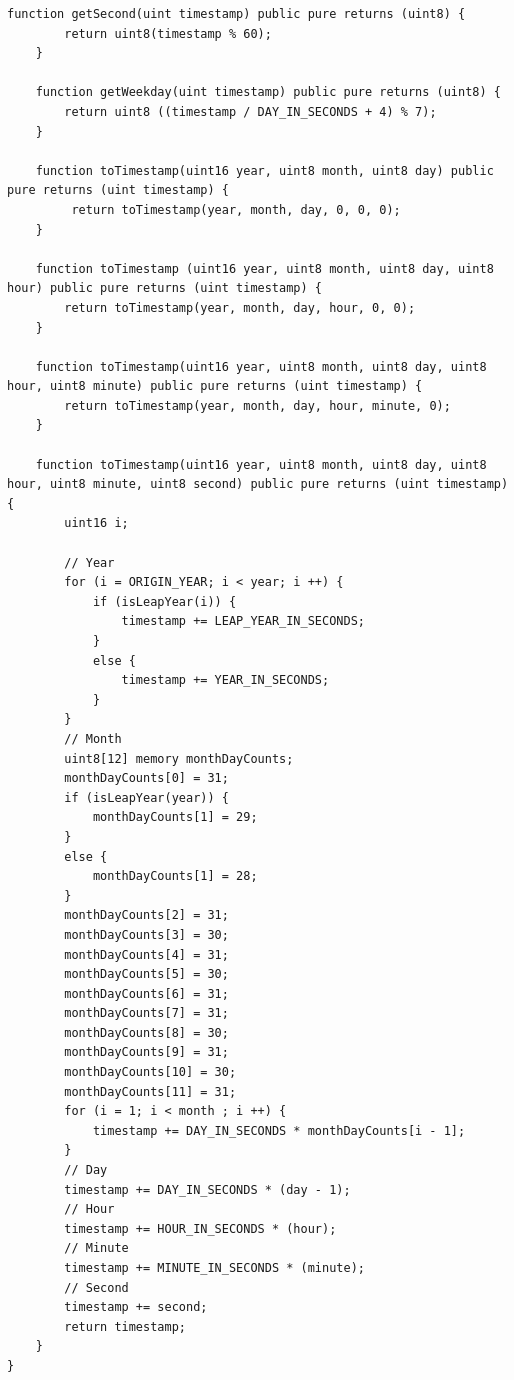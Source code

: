 \documentclass[a4paper]{article}
\begin{document}
\begin{frame}
\begin{lstlisting}[basicstyle=\small]
    function getSecond(uint timestamp) public pure returns (uint8) {
        return uint8(timestamp % 60);
    }
    
    function getWeekday(uint timestamp) public pure returns (uint8) {
        return uint8 ((timestamp / DAY_IN_SECONDS + 4) % 7);
    }
    
    function toTimestamp(uint16 year, uint8 month, uint8 day) public pure returns (uint timestamp) {
         return toTimestamp(year, month, day, 0, 0, 0);
    }
    
    function toTimestamp (uint16 year, uint8 month, uint8 day, uint8 hour) public pure returns (uint timestamp) {
        return toTimestamp(year, month, day, hour, 0, 0);
    }
    
    function toTimestamp(uint16 year, uint8 month, uint8 day, uint8 hour, uint8 minute) public pure returns (uint timestamp) {
        return toTimestamp(year, month, day, hour, minute, 0);
    }
    
    function toTimestamp(uint16 year, uint8 month, uint8 day, uint8 hour, uint8 minute, uint8 second) public pure returns (uint timestamp) {
        uint16 i;

        // Year
        for (i = ORIGIN_YEAR; i < year; i ++) {
            if (isLeapYear(i)) {
                timestamp += LEAP_YEAR_IN_SECONDS;
            }
            else {
                timestamp += YEAR_IN_SECONDS;
            }
        }
        // Month
        uint8[12] memory monthDayCounts;
        monthDayCounts[0] = 31;
        if (isLeapYear(year)) {
            monthDayCounts[1] = 29;
        }
        else {
            monthDayCounts[1] = 28;
        }
        monthDayCounts[2] = 31;
        monthDayCounts[3] = 30;
        monthDayCounts[4] = 31;
        monthDayCounts[5] = 30;
        monthDayCounts[6] = 31;
        monthDayCounts[7] = 31;
        monthDayCounts[8] = 30;
        monthDayCounts[9] = 31;
        monthDayCounts[10] = 30;
        monthDayCounts[11] = 31;
        for (i = 1; i < month ; i ++) {
            timestamp += DAY_IN_SECONDS * monthDayCounts[i - 1];
        }
        // Day
        timestamp += DAY_IN_SECONDS * (day - 1);
        // Hour
        timestamp += HOUR_IN_SECONDS * (hour);
        // Minute
        timestamp += MINUTE_IN_SECONDS * (minute);
        // Second
        timestamp += second;
        return timestamp;
    }
}
\end{lstlisting}
\end{frame}
\end{document}
